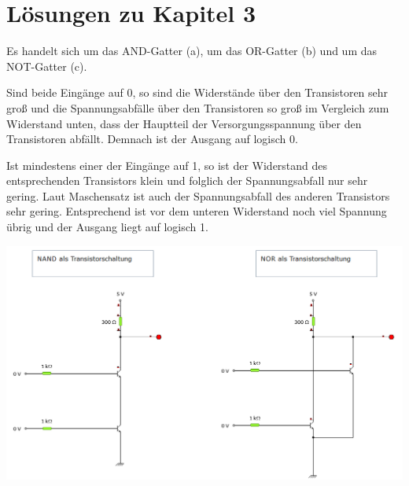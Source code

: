 \section{Lösungen zu Kapitel 3}

\begin{Loesung}
Es handelt sich um das AND-Gatter (a), um das OR-Gatter (b) und um das NOT-Gatter (c).
\end{Loesung}


\begin{Loesung}
Sind beide Eingänge auf 0, so sind die Widerstände über den Transistoren sehr groß und die Spannungsabfälle über den Transistoren so groß im Vergleich zum Widerstand unten, dass der Hauptteil der Versorgungsspannung über den Transistoren abfällt. Demnach ist der Ausgang auf logisch 0.

Ist mindestens einer der Eingänge auf 1, so ist der Widerstand des entsprechenden Transistors klein und folglich der Spannungsabfall nur sehr gering. Laut Maschensatz ist auch der Spannungsabfall des anderen Transistors sehr gering. Entsprechend ist vor dem unteren Widerstand noch viel Spannung übrig und der Ausgang liegt auf logisch 1.
\end{Loesung}


\begin{Loesung}
\hfill \par \vspace*{-.7cm}
\begin{center}
\includegraphics[scale=.6]{pics/Kap3/NANDNOR}
\end{center}
\end{Loesung}


